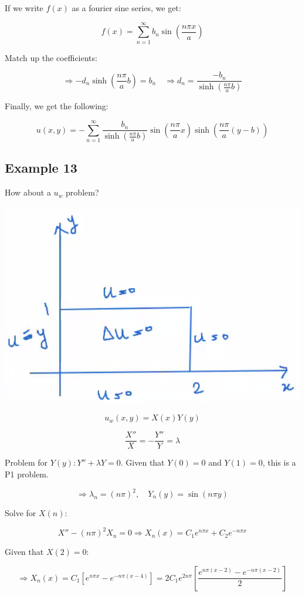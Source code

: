 \documentclass{article}
\begin{document}
If we write $f(x)$ as a fourier sine series, we get:

$$f(x) = \sum_{n=1}^\infty b_n \sin \left( \frac{n \pi x}{a} \right)$$

Match up the coefficients:

$$\Rightarrow - d_n \sinh \left( \frac{n \pi}{a} b \right) = b_n \quad \Rightarrow d_n = \frac{- b_n}{\sinh \left( \frac{n \pi}{a} b \right)}$$

Finally, we get the following:

$$u(x,y) = - \sum_{n=1}^\infty \frac{ b_n}{\sinh \left( \frac{n \pi}{a} b \right)} \sin \left( \frac{n \pi}{a} x \right) \sinh \left( \frac{n \pi}{a} (y-b) \right)$$

\subsection{Example 13}

How about a $u_w$ problem?

\begin{center}
    \includegraphics[width = 0.6 \textwidth]{image3.png}
\end{center}

$$u_w (x,y) = X(x) Y(y)$$

$$\frac{X''}{X} = - \frac{Y''}{Y} = \lambda$$

Problem for $Y(y): Y'' + \lambda Y = 0$. Given that $Y(0) = 0$ and $Y(1) = 0$, this is a P1 problem. 

$$\Rightarrow \lambda_n = (n \pi)^2, \quad Y_n(y) = \sin(n \pi y)$$

Solve for $X(n)$:

$$X'' - (n \pi)^2 X_n = 0 \Rightarrow X_n (x) = C_1 e^{n \pi x} + C_2 e^{-n \pi x}$$

Given that $X(2) = 0$:

$$\Rightarrow X_n (x) = C_1 \left[ e^{n \pi x} - e^{- n \pi (x-4)} \right] = 2 C_1 e^{2 n \pi} \left[ \frac{e^{n \pi (x-2)} - e^{- n \pi (x-2)}}{2} \right]$$
\end{document}
